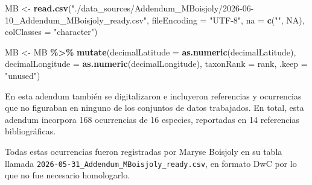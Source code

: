 \documentclass[sn-apa,pdflatex]{sn-jnl}
\newenvironment{Shaded}{\begin{snugshade}}{\end{snugshade}}
\newcommand{\AttributeTok}[1]{\textcolor[rgb]{0.13,0.29,0.53}{#1}}
\newcommand{\ConstantTok}[1]{\textcolor[rgb]{0.56,0.35,0.01}{#1}}
\newcommand{\FunctionTok}[1]{\textcolor[rgb]{0.13,0.29,0.53}{\textbf{#1}}}
\newcommand{\NormalTok}[1]{#1}
\newcommand{\OtherTok}[1]{\textcolor[rgb]{0.56,0.35,0.01}{#1}}
\newcommand{\SpecialCharTok}[1]{\textcolor[rgb]{0.81,0.36,0.00}{\textbf{#1}}}
\newcommand{\StringTok}[1]{\textcolor[rgb]{0.31,0.60,0.02}{#1}}
\begin{document}
\begin{Shaded}
\begin{Highlighting}[]
\NormalTok{MB }\OtherTok{\textless{}{-}} \FunctionTok{read.csv}\NormalTok{(}\StringTok{"./data\_sources/Addendum\_MBoisjoly/2026{-}06{-}10\_Addendum\_MBoisjoly\_ready.csv"}\NormalTok{,}
    \AttributeTok{fileEncoding =} \StringTok{"UTF{-}8"}\NormalTok{, }\AttributeTok{na =} \FunctionTok{c}\NormalTok{(}\StringTok{""}\NormalTok{, }\ConstantTok{NA}\NormalTok{), }\AttributeTok{colClasses =} \StringTok{"character"}\NormalTok{)}

\NormalTok{MB }\OtherTok{\textless{}{-}}\NormalTok{ MB }\SpecialCharTok{\%\textgreater{}\%}
    \FunctionTok{mutate}\NormalTok{(}\AttributeTok{decimalLatitude =} \FunctionTok{as.numeric}\NormalTok{(decimalLatitude), }\AttributeTok{decimalLongitude =} \FunctionTok{as.numeric}\NormalTok{(decimalLongitude),}
        \AttributeTok{taxonRank =}\NormalTok{ rank, }\AttributeTok{.keep =} \StringTok{"unused"}\NormalTok{)}
\end{Highlighting}
\end{Shaded}

En esta adendum también se digitalizaron e incluyeron referencias y
ocurrencias que no figuraban en ninguno de los conjuntos de datos
trabajados. En total, esta adendum incorpora 168 ocurrencias de 16
especies, reportadas en 14 referencias bibliográficas.

Todas estas ocurrencias fueron registradas por Maryse Boisjoly en su
tabla llamada \texttt{2026-05-31\_Addendum\_MBoisjoly\_ready.csv}, en
formato DwC por lo que no fue necesario homologarlo.
\end{document}
